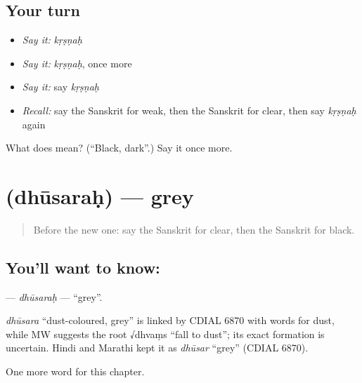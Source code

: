 \subsection*{Your turn}
\begin{itemize}
\raggedright
  \item \emph{Say it:} \emph{kṛṣṇaḥ}
  \item \emph{Say it:} \emph{kṛṣṇaḥ}, once more
  \item \emph{Say it:} say \emph{kṛṣṇaḥ}
  \item \emph{Recall:} say the Sanskrit for weak, then the Sanskrit for clear, then say \emph{kṛṣṇaḥ} again
\end{itemize}

\begin{tcolorbox}[breakable,colback=teal!4,colframe=teal!35!black,title={Before you move on}]
What does  mean? (\textquotedblleft{}Black, dark\textquotedblright{}.) Say it once more.
\end{tcolorbox}
\section[\texorpdfstring{\sk{धूसरः} (dhūsaraḥ)}{धूसरः (dhūsaraḥ)}]{ (dhūsaraḥ) — grey}

\label{lesson:SA-C131-dhusarah}



\begin{quote}
Before the new one: say the Sanskrit for clear, then the Sanskrit for black.
\end{quote}

\subsection*{You'll want to know: }
\textbf{} — \emph{dhūsaraḥ} — \textquotedblleft{}grey\textquotedblright{}.

\begin{cousinweb}
\emph{dhūsara} \textquotedblleft{}dust-coloured, grey\textquotedblright{} is linked by CDIAL 6870 with words for dust, while MW suggests the root √dhvaṃs \textquotedblleft{}fall to dust\textquotedblright{}; its exact formation is uncertain. Hindi and Marathi kept it as \emph{dhūsar} \textquotedblleft{}grey\textquotedblright{} (CDIAL 6870).
\end{cousinweb}

\begin{grammarlens}[title={What you've built}]
One more word for this chapter.
\end{grammarlens}

